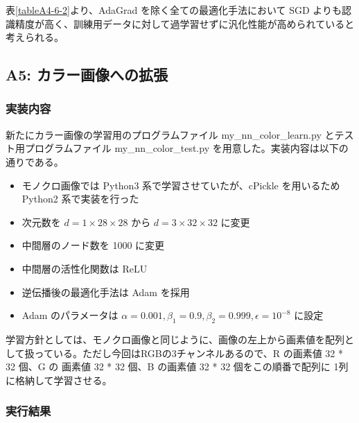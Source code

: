 \documentclass[a4paper,dvipdfmx]{jsarticle}
\begin{document}
表\ref{tableA4-6-2}より、AdaGrad を除く全ての最適化手法において SGD よりも認識精度が高く、訓練用データに対して過学習せずに汎化性能が高められていると考えられる。

\subsection*{A5: カラー画像への拡張}

\subsubsection*{実装内容}

新たにカラー画像の学習用のプログラムファイル my\_nn\_color\_learn.py とテスト用プログラムファイル my\_nn\_color\_test.py を用意した。実装内容は以下の通りである。

\begin{itemize}
	\item モノクロ画像では Python3 系で学習させていたが、cPickle を用いるため Python2 系で実装を行った
	\item 次元数を $ d=1 \times 28 \times 28 $ から $ d=3 \times 32 \times 32 $ に変更
	\item 中間層のノード数を 1000 に変更
	\item 中間層の活性化関数は ReLU
	\item 逆伝播後の最適化手法は Adam を採用
	\item Adam のパラメータは $\alpha = 0.001, \beta_1 = 0.9, \beta_2 =  0.999, \epsilon = 10^{-8}$ に設定
\end{itemize}

学習方針としては、モノクロ画像と同じように、画像の左上から画素値を配列として扱っている。ただし今回はRGBの3チャンネルあるので、R の画素値 32 * 32 個、G の 画素値 32 * 32 個、B の画素値 32 * 32 個をこの順番で配列に 1列に格納して学習させる。

\subsubsection*{実行結果}
\end{document}
